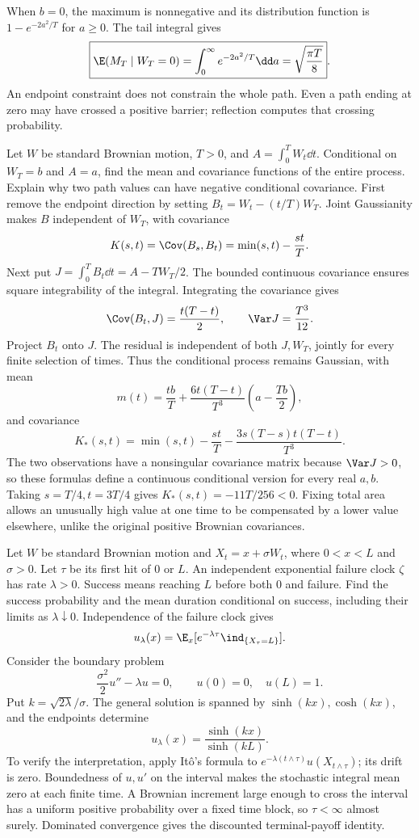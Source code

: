 When $b=0$, the maximum is nonnegative and its distribution function is $1-e^{-2a^2/T}$ for $a\ge0$. The tail integral gives
\[
 \boxed{\E(M_T\mid W_T=0)=\int_0^\infty e^{-2a^2/T}\dd a
 =\sqrt{\frac{\pi T}{8}}}.
\]
\insight An endpoint constraint does not constrain the whole path. Even a path ending at zero may have crossed a positive barrier; reflection computes that crossing probability.

Let $W$ be standard Brownian motion, $T>0$, and $A=\int_0^T W_t\dd t$. Conditional on $W_T=b$ and $A=a$, find the mean and covariance functions of the entire process. Explain why two path values can have negative conditional covariance.
\solution First remove the endpoint direction by setting $B_t=W_t-(t/T)W_T$. Joint Gaussianity makes $B$ independent of $W_T$, with covariance
\[
 K(s,t)=\Cov(B_s,B_t)=\min(s,t)-\frac{st}{T}.
\]
Next put $J=\int_0^T B_t\dd t=A-TW_T/2$. The bounded continuous covariance ensures square integrability of the integral. Integrating the covariance gives
\[
 \Cov(B_t,J)=\frac{t(T-t)}2,\qquad \Var J=\frac{T^3}{12}.
\]
Project $B_t$ onto $J$. The residual is independent of both $J,W_T$, jointly for every finite selection of times. Thus the conditional process remains Gaussian, with mean
\[
 \boxed{m(t)=\frac{tb}{T}
 +\frac{6t(T-t)}{T^3}\left(a-\frac{Tb}{2}\right)},
\]
and covariance
\[
 \boxed{K_*(s,t)=\min(s,t)-\frac{st}{T}
 -\frac{3s(T-s)t(T-t)}{T^3}}.
\]
The two observations have a nonsingular covariance matrix because $\Var J>0$, so these formulas define a continuous conditional version for every real $a,b$. Taking $s=T/4,t=3T/4$ gives $K_*(s,t)=-11T/256<0$. Fixing total area allows an unusually high value at one time to be compensated by a lower value elsewhere, unlike the original positive Brownian covariances.

Let $W$ be standard Brownian motion and $X_t=x+\sigma W_t$, where $0<x<L$ and $\sigma>0$. Let $\tau$ be its first hit of 0 or $L$. An independent exponential failure clock $\zeta$ has rate $\lambda>0$. Success means reaching $L$ before both 0 and failure. Find the success probability and the mean duration conditional on success, including their limits as $\lambda\downarrow0$.
\solution Independence of the failure clock gives
\[
 u_\lambda(x)=\E_x[e^{-\lambda\tau}\ind_{\{X_\tau=L\}}].
\]
Consider the boundary problem
\[
 \frac{\sigma^2}{2}u''-\lambda u=0,\qquad u(0)=0,\quad u(L)=1.
\]
Put $k=\sqrt{2\lambda}/\sigma$. The general solution is spanned by $\sinh(kx),\cosh(kx)$, and the endpoints determine
\[
 \boxed{u_\lambda(x)=\frac{\sinh(kx)}{\sinh(kL)}}.
\]
To verify the interpretation, apply It\^o's formula to $e^{-\lambda(t\wedge\tau)}u(X_{t\wedge\tau})$; its drift is zero. Boundedness of $u,u'$ on the interval makes the stochastic integral mean zero at each finite time. A Brownian increment large enough to cross the interval has a uniform positive probability over a fixed time block, so $\tau<\infty$ almost surely. Dominated convergence gives the discounted terminal-payoff identity.

